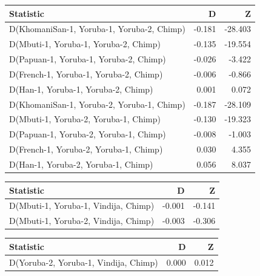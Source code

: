 \begin{table}[ht]
  \centering
  \begin{tabular}{lrr}
    \hline
  Statistic & D & Z \\ 
    \hline
  D(KhomaniSan-1, Yoruba-1, Yoruba-2, Chimp) & -0.181 & -28.403 \\ 
    D(Mbuti-1, Yoruba-1, Yoruba-2, Chimp) & -0.135 & -19.554 \\ 
    D(Papuan-1, Yoruba-1, Yoruba-2, Chimp) & -0.026 & -3.422 \\ 
    D(French-1, Yoruba-1, Yoruba-2, Chimp) & -0.006 & -0.866 \\ 
    D(Han-1, Yoruba-1, Yoruba-2, Chimp) & 0.001 & 0.072 \\ 
    D(KhomaniSan-1, Yoruba-2, Yoruba-1, Chimp) & -0.187 & -28.109 \\ 
    D(Mbuti-1, Yoruba-2, Yoruba-1, Chimp) & -0.130 & -19.323 \\ 
    D(Papuan-1, Yoruba-2, Yoruba-1, Chimp) & -0.008 & -1.003 \\ 
    D(French-1, Yoruba-2, Yoruba-1, Chimp) & 0.030 & 4.355 \\ 
    D(Han-1, Yoruba-2, Yoruba-1, Chimp) & 0.056 & 8.037 \\ 
     \hline
  \end{tabular}
  \label{dstats:a1}
  \end{table}
  
  \begin{table}[ht]
  \centering
  \begin{tabular}{lrr}
    \hline
  Statistic & D & Z \\ 
    \hline
  D(Mbuti-1, Yoruba-1, Vindija, Chimp) & -0.001 & -0.141 \\ 
    D(Mbuti-1, Yoruba-2, Vindija, Chimp) & -0.003 & -0.306 \\ 
     \hline
  \end{tabular}
  \label{dstats:a5}
  \end{table}
  
  \begin{table}[ht]
  \centering
  \begin{tabular}{lrr}
    \hline
  Statistic & D & Z \\ 
    \hline
  D(Yoruba-2, Yoruba-1, Vindija, Chimp) & 0.000 & 0.012 \\ 
     \hline
  \end{tabular}
  \label{dstats:a4}
  \end{table}
  
